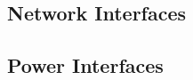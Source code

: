 \subsection{Network Interfaces}
\label{loc:ExtIF_Network}





\KNEADSUBSECTIONNEWPAGE
\subsection{Power Interfaces}
\label{loc:ExtIF_Power}



